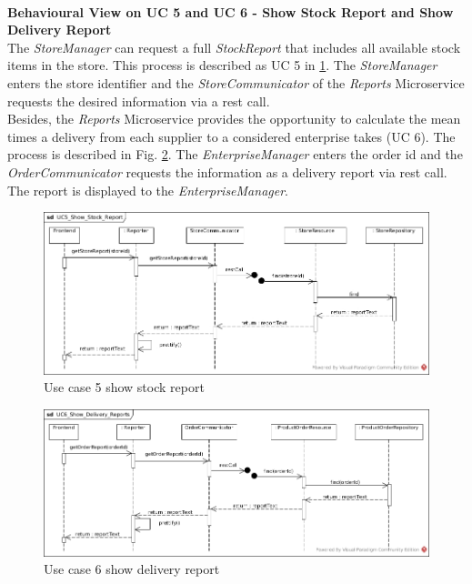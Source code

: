		 \noindent
		 \\
		\textbf{Behavioural View on UC 5 and UC 6 - Show Stock Report and Show Delivery Report} \\
		The \textit{StoreManager} can request a full \textit{StockReport} that includes all available stock items in the store. This process is described as UC 5 in \ref{MS_UC5}. The \textit{StoreManager} enters the store identifier and the \textit{StoreCommunicator} of the \textit{Reports} Microservice requests the desired information via a rest call.
		\\
		Besides, the \textit{Reports} Microservice provides the opportunity to calculate the mean times a delivery from each supplier to a considered enterprise takes (UC 6). The process is described in  Fig. \ref{MS_UC6}. The \textit{EnterpriseManager} enters the order id and the \textit{OrderCommunicator} requests the information as a delivery report via rest call. The report is displayed to the \textit{EnterpriseManager}.
		
	
			
			\begin{figure}[!h]
				\centering
				\includegraphics[width = 1\textwidth]{img/UC5_Show_Stock_Report.jpg}
				\caption{Use case 5 show stock report}
				\label{MS_UC5}
			\end{figure}
			
			\begin{figure}[!h]
				\centering
				\includegraphics[width = 1\textwidth]{img/UC6_Show_Delivery_Reports.jpg}
				\caption{Use case 6 show delivery report}
				\label{MS_UC6}
			\end{figure}
			
